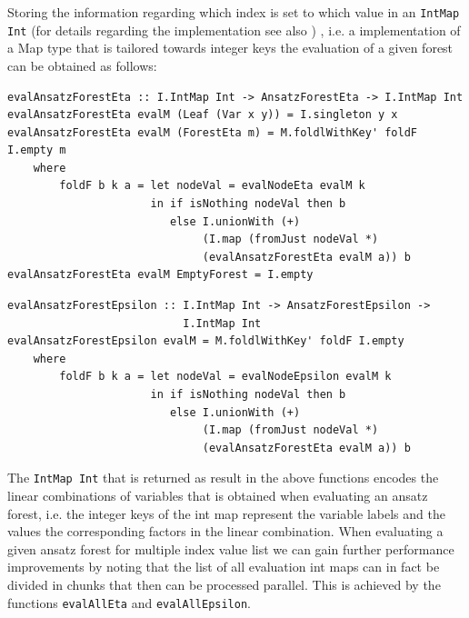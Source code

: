 \documentclass[a4paper,12pt, DIV=14, BCOR=5mm, twoside, headsepline]{scrbook}
\begin{document}
Storing the information regarding which index is set to which value in an \texttt{IntMap Int} \cite{HackageIntMap} (for details regarding the implementation see also \cite{Okasaki98fastmergeable}) , i.e. a implementation of a Map type that is tailored towards integer keys the evaluation of a given forest can be obtained as follows: 

\begin{samepage}
\begin{verbatim}
evalAnsatzForestEta :: I.IntMap Int -> AnsatzForestEta -> I.IntMap Int
evalAnsatzForestEta evalM (Leaf (Var x y)) = I.singleton y x
evalAnsatzForestEta evalM (ForestEta m) = M.foldlWithKey' foldF I.empty m
    where
        foldF b k a = let nodeVal = evalNodeEta evalM k
                      in if isNothing nodeVal then b
                         else I.unionWith (+)
                              (I.map (fromJust nodeVal *)
                              (evalAnsatzForestEta evalM a)) b
evalAnsatzForestEta evalM EmptyForest = I.empty
\end{verbatim} 
\end{samepage}

\begin{samepage}
\begin{verbatim}
evalAnsatzForestEpsilon :: I.IntMap Int -> AnsatzForestEpsilon ->
                           I.IntMap Int
evalAnsatzForestEpsilon evalM = M.foldlWithKey' foldF I.empty
    where
        foldF b k a = let nodeVal = evalNodeEpsilon evalM k
                      in if isNothing nodeVal then b
                         else I.unionWith (+) 
                              (I.map (fromJust nodeVal *)
                              (evalAnsatzForestEta evalM a)) b  
\end{verbatim} 
\end{samepage}

The \texttt{IntMap Int} that is returned as result in the above functions encodes the linear combinations of variables that is obtained when evaluating an ansatz forest, i.e. the integer keys of the int map represent the variable labels and the values the corresponding factors in the linear combination. 
When evaluating a given ansatz forest for multiple index value list we can gain further performance improvements by noting that the list of all evaluation int maps can in fact be divided in chunks that then can be processed parallel. This is achieved by the functions \texttt{evalAllEta} and \texttt{evalAllEpsilon}.
\end{document}
